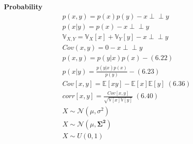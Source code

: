 \documentclass[fleqn,9pt]{article}
\newcommand{\indep}{\perp \!\!\! \perp}
\begin{document}
\begin{minipage}[t]{0.33\textwidth}
\textbf{Probability}
\begin{equation*}
\begin{split}
	p(x,y) = p(x)p(y) -  x \indep y\\
	p(x|y) = p(x) -  x \indep y\\
	\mathbb{V}_{X,Y} =  \mathbb{V}_X[x] + \mathbb{V}_Y[y] - x \indep y\\
	Cov(x,y) = 0 - x \indep y\\
p(x,y) = p(y|x)p(x) - (6.22)\\
p(x|y) = \frac{p(y|x)p(x)}{p(y)} - (6.23)\\
Cov[x,y] = \mathbb{E}[xy]-\mathbb{E}[x]\mathbb{E}[y]\;(6.36)\\
corr[x,y] = \frac{Cov[x,y]}{\sqrt{\mathbb{V}[x] \mathbb{V}[y]}}\;(6.40)\\
X\sim \mathcal{N}(\mu,\sigma^2)\\
X\sim \mathcal{N}(\mu, \boldsymbol{\Sigma^2})\\
X \sim U(0, 1)\\
\end{split}		
\end{equation*}

\end{minipage}%
\end{document}
